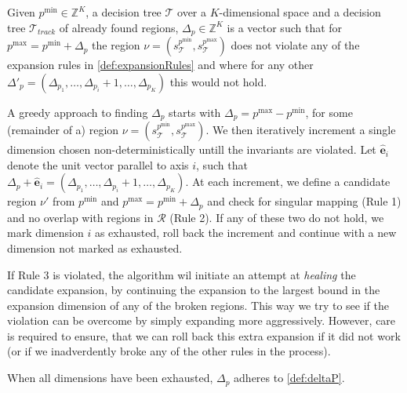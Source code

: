
\begin{definition}\label{def:deltaP}
    Given $p^{\min} \in \mathbb{Z}^{K}$, a decision tree $\mathcal{T}$ over a
    $K$-dimensional space and a decision tree $\mathcal{T}_{track}$ of already
    found regions, $\Delta_{p} \in \mathbb{Z}^{K}$ is a vector such that for
    $p^{\max} = p^{\min} + \Delta_{p}$ the region $\nu =
    (s^{p^{\min}}_{\mathcal{T}}, s^{p^{\max}}_{\mathcal{T}})$ does not violate
    any of the expansion rules in \cref{def:expansionRules} and where
    for any other $\Delta'_p = (\Delta_{p_{1}}, \ldots, \Delta_{p_{i}} + 1,
    \ldots, \Delta_{p_{K}})$ this would not hold.
\end{definition}

\noindent A greedy approach to finding $\Delta_{p}$ starts with $\Delta_{p} =
p^{\max} - p^{\min}$, for some (remainder of a) region $\nu =
(s^{p^{\min}}_{\mathcal{T}}, s^{p^{\max}}_{\mathcal{T}})$. We then iteratively
increment a single dimension chosen non-deterministically untill the invariants
are violated.  Let $\mathbf{\hat{e}}_i$ denote the unit vector parallel to axis
$i$, such that $\Delta_{p} + \mathbf{\hat{e}}_i =
(\Delta_{p_1},\ldots,\Delta_{p_i} + 1,\ldots,\Delta_{p_K})$. At each increment,
we define a candidate region $\nu'$ from $p^{\min}$ and $p^{\max} = p^{\min} +
\Delta_{p}$ and check for singular mapping (Rule 1) and no overlap with regions
in $\mathcal{R}$ (Rule 2). If any of these two do not hold, we mark dimension
$i$ as exhausted, roll back the increment and continue with a new dimension not
marked as exhausted.

If Rule 3 is violated, the algorithm wil initiate an attempt at \textit{healing}
the candidate expansion, by continuing the expansion to the largest bound in
the expansion dimension of any of the broken regions. This way we try to see if
the violation can be overcome by simply expanding more aggressively. However,
care is required to ensure, that we can roll back this extra expansion if it did
not work (or if we inadverdently broke any of the other rules in the process).

When all dimensions have been
exhausted, $\Delta_{p}$ adheres to \cref{def:deltaP}.

